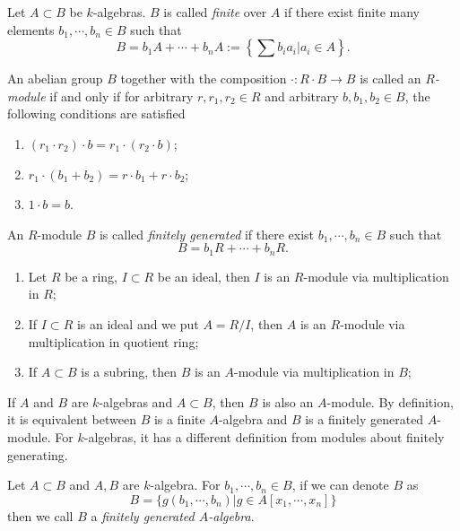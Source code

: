 \begin{definition}[Finiteness]
	Let $ A\subset B $ be $ k $-algebras. $ B $ is called \textit{finite} over $ A $ if there exist finite many elements $ b_1,\cdots,b_n\in B $ such that
	$$
		B=b_1 A+\cdots+b_n A:=\left\{ \sum b_ia_i|a_i\in A \right\}.
	$$
\end{definition}
\begin{definition}[$ R $-module]
	An abelian group $ B $ together with the composition $ \cdot:R\cdot B\to B $ is called an \textit{$ R $-module} if and only if for arbitrary $ r,r_1,r_2\in R $ and arbitrary $ b,b_1,b_2 \in B$, the following conditions are satisfied\begin{enumerate}
		\item $ (r_1\cdot r_2)\cdot b = r_1\cdot (r_2\cdot b) $;
		\item $ r_1\cdot(b_1+b_2)=r\cdot b_1+r\cdot b_2 $;
		\item $ 1\cdot b = b $.
	\end{enumerate}
\end{definition}
\begin{definition}
	An $ R $-module $ B $ is called \textit{finitely generated} if there exist $ b_1,\cdots,b_n\in B $ such that
	$$
		B=b_1R+\cdots+ b_n R.
	$$
\end{definition}
\begin{example}
	\begin{enumerate}
		\item Let $ R $ be a ring, $ I\subset R $ be an ideal, then $ I $ is an $ R $-module via multiplication in $ R $;
		\item If $ I\subset R $ is an ideal and we put $ A=R\slash I $, then $ A $ is an $ R $-module via multiplication in quotient ring;
		\item If $ A\subset B $ is a subring, then $ B $ is an $ A $-module via multiplication in $ B $;
	\end{enumerate}
\end{example}
If $ A $ and $ B $ are $ k $-algebras and $ A\subset B $, then $ B $ is also an $ A $-module. By definition, it is equivalent between $ B $ is a finite $ A $-algebra and $ B $ is a finitely generated $ A $-module. For $ k $-algebras, it has a different definition from modules about finitely generating.
\begin{definition}
	Let $ A\subset B $ and $ A,B $ are $ k $-algebra. For $ b_1,\cdots,b_n\in B $, if we can denote $ B $ as
	$$
		B=\lbrace g(b_1,\cdots,b_n)|g\in A[x_1,\cdots,x_n] \rbrace
	$$
	then we call $ B $ a \textit{finitely generated $ A $-algebra}.
\end{definition}
